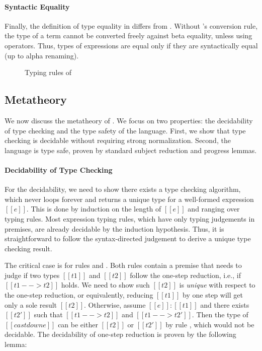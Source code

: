 \paragraph{Syntactic Equality}
Finally, the definition of type equality in \ecore differs from
\cc. Without \cc's conversion rule, the type of a term cannot be
converted freely against beta equality, unless using \cast
operators. Thus, types of expressions are equal only if they are
syntactically equal (up to alpha renaming).

\begin{figure}
    \ottdefnctx{}\ottinterrule
    \ottdefnexpr{}
    \caption{Typing rules of \ecore}
    \label{fig:ecore:typing}
\end{figure}

\subsection{Metatheory}\label{sec:ecore:meta}
We now discuss the metatheory of \ecore. We focus on two properties:
the decidability of type checking and the type safety of the
language. First, we show that type checking \ecore is decidable
without requiring strong normalization. Second, the language is type
safe, proven by standard subject reduction and progress lemmas.

\paragraph{Decidability of Type Checking}
For the decidability, we need to show there exists a type checking
algorithm, which never loops forever and returns a unique type for a
well-formed expression $[[e]]$. This is done by induction on the
length of $[[e]]$ and ranging over typing rules. Most expression
typing rules, which have only typing judgements in premises, are
already decidable by the induction hypothesis. Thus, it is
straightforward to follow the syntax-directed judgement to derive a
unique type checking result.

The critical case is for rules  and
.  Both rules contain a premise that needs to
judge if two types $[[t1]]$ and $[[t2]]$ follow the one-step
reduction, i.e., if $[[t1 --> t2]]$ holds. We need to show such
$[[t2]]$ is \emph{unique} with respect to the one-step reduction, or
equivalently, reducing $[[t1]]$ by one step will get only a sole
result $[[t2]]$. Otherwise, assume $[[e]]:[[t1]]$ and there exists
$[[t2']]$ such that $[[t1 --> t2]]$ and $[[t1 --> t2']]$. Then the
type of $[[castdown e]]$ can be either $[[t2]]$ or $[[t2']]$ by rule
, which would not be decidable. The decidability
of one-step reduction is
proven by the following lemma:


